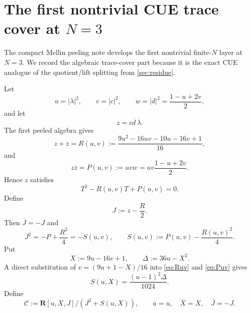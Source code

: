 \documentclass[11pt]{article}
\newcommand{\R}{\mathbf R}
\newcommand{\1}{\mathbf 1}
\numberwithin{equation}{section}
\begin{document}
\section{The first nontrivial CUE trace cover at $N=3$}\label{sec:N3}

The compact Mellin peeling note develops the first nontrivial finite-$N$ layer at $N=3$.  We record the algebraic trace-cover part because it is the exact CUE analogue of the quotient/lift splitting from \cref{sec:residue}.

Let
\begin{equation}
  u=|\lambda|^2,
  \qquad
  v=|c|^2,
  \qquad
  w=|d|^2=\frac{1-u+2v}{2},
\end{equation}
and let
\begin{equation}
  z=c\overline d\,\overline\lambda.
\end{equation}
The first peeled algebra gives
\begin{equation}\label{eq:Ruv}
  z+\overline z=R(u,v):=\frac{9u^2-16uv-10u-16v+1}{16},
\end{equation}
and
\begin{equation}\label{eq:Puv}
  z\overline z=P(u,v):=uvw=uv\frac{1-u+2v}{2}.
\end{equation}
Hence $z$ satisfies
\begin{equation}
  T^2-R(u,v)T+P(u,v)=0.
\end{equation}
Define
\begin{equation}
  J:=z-\frac R2.
\end{equation}
Then $\overline J=-J$ and
\begin{equation}
  J^2=-P+\frac{R^2}{4}=-S(u,v),
  \qquad
  S(u,v):=P(u,v)-\frac{R(u,v)^2}{4}.
\end{equation}
Put
\begin{equation}
  X:=9u-16v+1,
  \qquad
  \Delta:=36u-X^2.
\end{equation}
A direct substitution of $v=(9u+1-X)/16$ into \eqref{eq:Ruv} and \eqref{eq:Puv} gives
\begin{equation}\label{eq:S-Delta}
  S(u,X)=\frac{(u-1)^2\Delta}{1024}.
\end{equation}
Define
\begin{equation}
  \mathcal C:=\R[u,X,J]/(J^2+S(u,X)),
  \qquad
  \overline u=u,
  \quad
  \overline X=X,
  \quad
  \overline J=-J.
\end{equation}
\end{document}

